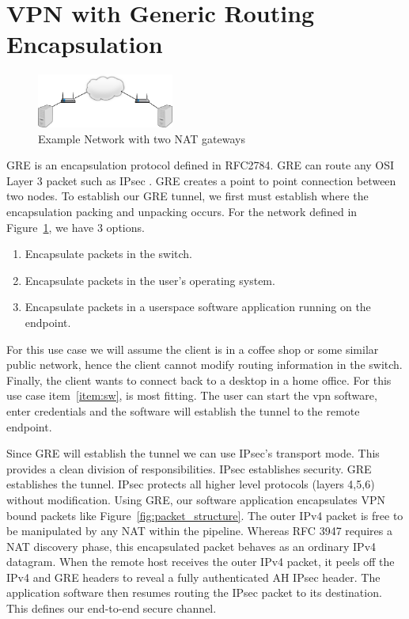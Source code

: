 \documentclass[conference,12pt]{IEEEtran}
\begin{document}
\section{VPN with Generic Routing Encapsulation}

\begin{figure}
\centering
\includegraphics[width=0.4\textwidth]{network.png}
\caption{Example Network with two NAT gateways}
\label{fig:network}
\end{figure}
GRE is an encapsulation protocol defined in RFC2784. GRE can route any OSI Layer
3 packet such as IPsec \autocite{rfc2784}. GRE creates a point to point
connection between two nodes.  To establish our GRE tunnel, we first must
establish where the encapsulation packing and unpacking occurs. For the
network defined in Figure~\ref{fig:network}, we have 3 options. 
\begin{enumerate}
\item Encapsulate packets in the switch.
\item Encapsulate packets in the user's operating system.
\item \label{item:sw} Encapsulate packets in a userspace software application running on the endpoint.
\end{enumerate}
For this use case we will assume the client is in a coffee shop or some similar
public network, hence the client cannot modify routing information in the switch.
Finally, the client wants to connect back to a desktop in a home office. For
this use case 
item~\ref{item:sw}, is most fitting. The user can start the vpn software, enter
credentials and the software will establish the tunnel to the remote endpoint.

Since GRE will establish the tunnel we can use IPsec's transport mode. This
provides a clean division of responsibilities.  IPsec establishes security. GRE
establishes the tunnel.  IPsec protects all higher level protocols
(layers 4,5,6) without modification. Using GRE, our software
application encapsulates VPN bound packets like
Figure~\ref{fig:packet_structure}.  The outer IPv4 packet is free to be manipulated
by any NAT within the pipeline. Whereas RFC 3947 requires a NAT discovery phase,
this encapsulated packet behaves as an ordinary IPv4 datagram. When the remote
host receives the outer IPv4 packet, it peels off the IPv4 and GRE headers 
to reveal a fully authenticated AH IPsec header. The
application software then resumes routing the IPsec packet to its destination.
This defines our end-to-end secure channel.
\end{document}
